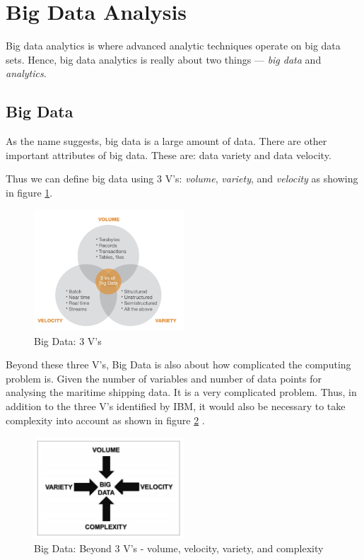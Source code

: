 \section{Big Data Analysis}

Big data analytics is where advanced analytic techniques operate on big data sets. Hence, big data
analytics is really about two things — \textit{big data} and \textit{analytics}.



\subsection{Big Data}

As the name suggests, big data is a large amount of data. There are other important attributes of big data. These are:  data variety and data velocity.

Thus we can define big data using 3 V's: \textit{volume}, \textit{variety}, and \textit{velocity} as showing in figure \ref*{bigData}.

\begin{figure}[h]
    \centering
    \includegraphics[width=0.5\textwidth]{images/big_data.png}
    \caption{Big Data: 3 V's \autocite{3vbigdata}}
    \label{bigData}
\end{figure}

Beyond these three V's, Big Data is also about how complicated the computing
problem is. Given the number of variables and number of data points for analysing the maritime shipping data. It is a very complicated problem.
Thus, in addition to the three V's identified by IBM, it would also be necessary to take complexity into account as shown in figure \ref*{bigDataComplex} \autocite{pence2014big}.

\begin{figure}[h]
    \centering
    \includegraphics[width=0.5\textwidth]{images/big_data_complex.png}
    \caption{Big Data: Beyond 3 V's - volume, velocity,
        variety, and complexity}
    \label{bigDataComplex}
\end{figure}


